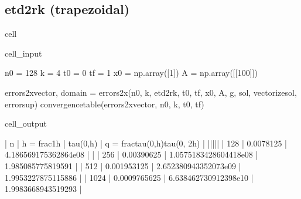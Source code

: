 \documentclass[letterpaper,10pt,english]{jupyterBook}
\begin{document}
\subsection{etd2rk (trapezoidal)}
\label{\detokenize{appendix:etd2rk-trapezoidal}}
\begin{sphinxuseclass}{cell}\begin{sphinxVerbatimInput}

\begin{sphinxuseclass}{cell_input}
\begin{sphinxVerbatim}[commandchars=\\\{\}]
n0 = 128
k = 4
t0 = 0
tf = 1
x0 = np.array([1])
A = np.array([[100]])

errors\PYGZus{}2x\PYGZus{}vector, domain = errors\PYGZus{}2x(n0, k, etd2rk, t0, tf, x0, A, g, sol, vectorize\PYGZus{}sol, error\PYGZus{}sup)
convergence\PYGZus{}table(errors\PYGZus{}2x\PYGZus{}vector, n0, k, t0, tf)
\end{sphinxVerbatim}

\end{sphinxuseclass}\end{sphinxVerbatimInput}
\begin{sphinxVerbatimOutput}

\begin{sphinxuseclass}{cell_output}
\begin{sphinxVerbatim}[commandchars=\\\{\}]
| n | h = \PYGZdl{}\PYGZbs{}frac\PYGZob{}1\PYGZcb{}\PYGZob{}h\PYGZcb{}\PYGZdl{} | \PYGZdl{}\PYGZbs{}tau(0,h)\PYGZdl{} | q = \PYGZdl{}\PYGZbs{}frac\PYGZob{}tau(0,h)\PYGZcb{}\PYGZob{}tau(0, 2h)\PYGZcb{}\PYGZdl{} |
|\PYGZhy{}\PYGZhy{}\PYGZhy{}|\PYGZhy{}\PYGZhy{}\PYGZhy{}\PYGZhy{}\PYGZhy{}\PYGZhy{}\PYGZhy{}\PYGZhy{}\PYGZhy{}\PYGZhy{}\PYGZhy{}\PYGZhy{}\PYGZhy{}\PYGZhy{}\PYGZhy{}\PYGZhy{}\PYGZhy{}|\PYGZhy{}\PYGZhy{}\PYGZhy{}\PYGZhy{}\PYGZhy{}\PYGZhy{}\PYGZhy{}\PYGZhy{}\PYGZhy{}\PYGZhy{}\PYGZhy{}|\PYGZhy{}\PYGZhy{}\PYGZhy{}\PYGZhy{}\PYGZhy{}\PYGZhy{}\PYGZhy{}\PYGZhy{}\PYGZhy{}\PYGZhy{}\PYGZhy{}\PYGZhy{}\PYGZhy{}\PYGZhy{}\PYGZhy{}\PYGZhy{}\PYGZhy{}\PYGZhy{}\PYGZhy{}\PYGZhy{}\PYGZhy{}\PYGZhy{}\PYGZhy{}\PYGZhy{}\PYGZhy{}\PYGZhy{}\PYGZhy{}\PYGZhy{}\PYGZhy{}\PYGZhy{}\PYGZhy{}\PYGZhy{}\PYGZhy{}|
 | 128 | 0.0078125 | 4.186569175362864e\PYGZhy{}08 | \PYGZhy{} | 
 | 256 | 0.00390625 | 1.0575183428604418e\PYGZhy{}08 | 1.985085775819591 | 
 | 512 | 0.001953125 | 2.652380943352073e\PYGZhy{}09 | 1.9953227875115886 | 
 | 1024 | 0.0009765625 | 6.638462730912398e\PYGZhy{}10 | 1.9983668943519293 | 
\end{sphinxVerbatim}

\end{sphinxuseclass}\end{sphinxVerbatimOutput}

\end{sphinxuseclass}
\end{document}
